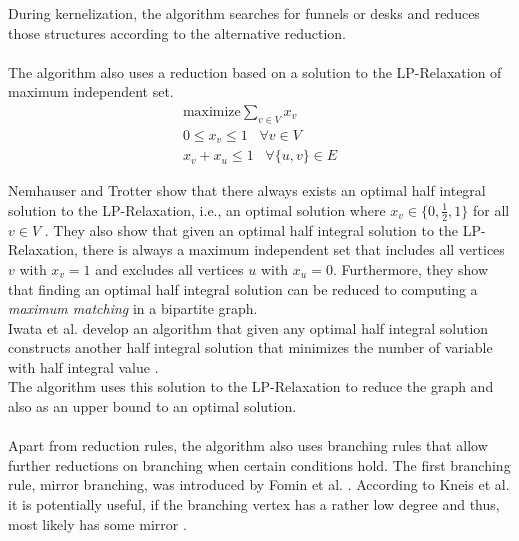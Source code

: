 \documentclass[]{article}
\begin{document}
During kernelization, the algorithm searches for funnels or desks and reduces those structures according to the alternative reduction.\paragraph{}
The algorithm also uses a reduction based on a solution to the LP-Relaxation of maximum independent set.
\begin{gather*}
	\text{maximize} \sum_{v\in V}x_v\\
	0\leq x_v\leq 1 \;\;\; \forall v\in V\\
	x_v + x_u\leq 1 \;\;\; \forall \{u,v\}\in E
\end{gather*}

Nemhauser and Trotter show that there always exists an optimal half integral solution to the LP-Relaxation, i.e., an optimal solution where $x_v\in\{0,\frac{1}{2},1\}$ for all $v\in V$ \cite{NemhauserTrotter}. They also show that given an optimal half integral solution to the LP-Relaxation, there is always a maximum independent set that includes all vertices $v$ with $x_v=1$ and excludes all vertices $u$ with $x_u = 0$. Furthermore, they show that finding an optimal half integral solution can be reduced to computing a \textit{maximum matching} in a bipartite graph. \\
Iwata et al. develop an algorithm that given any optimal half integral solution constructs another half integral solution that minimizes the number of variable with half integral value \cite{IwataOkaYoshida}.\\
The algorithm uses this solution to the LP-Relaxation to reduce the graph and also as an upper bound to an optimal solution.\paragraph{}
Apart from reduction rules, the algorithm also uses branching rules that allow further reductions on branching when certain conditions hold. The first branching rule, mirror branching, was introduced by Fomin et al. \cite{Fomin}. According to Kneis et al. it is potentially useful, if the branching vertex has a rather low degree and thus, most likely has some mirror \cite{Kneis}.
\end{document}
